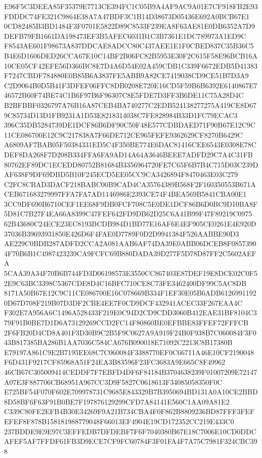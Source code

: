 \documentclass[UTF8,fontset=fandol,zihao=-4,a4paper]{ctexart}
\begin{document}
{{E96F5C3DEEA85F35379E7713CE394FC1C05B9A4AF9AC9A01E7CF918FB2E93FDDDC74FE321C9864E38A7A47BDF3C1B14D38673D05436E692A0BCB67E1
0CD82485B3BD1484F3F0701E5822D89C8533F239EA8F63AE81E0DB6352A7D9DEFB79FB1661DA198473EF3B5AFEC6031B1C3B7361E1DC789973A1ED9C
F8543AE601F98673A837DDCAE8ADCC80C437AEE1E1F0CBED837C35B36C5B4E6D1606DED26CCA67E10C14BF2B06FC82B5953E30F2C615F58E96BCB16A
10CE05CF42EFE56D366BC8E7D4A6D54E02A459CDB1C339F6672EDB5D41383F7247CBDF784880E0B85B6A3837FE5ABB9A82CE7419038CD9CE51B7D3A9
C2D9064B0D5B41F3DFEF06FFC8DB0208E720E16CD5F59B6B6392E6140867E746572B60F74BE74C1B6F97B6F96307C8E5FDE7D3FF3B6DE11C75A28D4C
B2BFBBF0326797A76B16A87CEB4BA740277C2EDB524138277275A419CE8D679C85734D13D1FB9231A1D53E8218314038C7FE828984B33D1FC79ECAC3
396C35DB5284739DE1DCF86B6DF90C50F48E577CDBDAED71F90B67E12C9C11CE086700E12C9C217838A7F66DE712CE965FEFE9362629CF8270B6429C
A6809AF7BAB05F50384331ED5C4F350BE774E6DAC81416CEE6543E0308E78CDEF8DA268F7D208B334FFA6FA9AD14A64A3646BEEE7ADFD29C7A4C31FB
80762EF89DC1ECEDD80752B81684B3356964720FE7C65F6B7B4C715D03C239DAF638F9DF69DBD5B10F245ECD5EE05CC9CA3426894F8470463E03C279
C2FC8CBAD3DACF218BABC00B9CAD4CA35764389B568F2F160350553B671ACEB671683279997FFA7FA7AD1146986E2393CE74F4BEA569B5841CBA00E1
3CC9DF690B6710CEF1EE68F9DB0FCF708C5E0DE1DCF86B6D0BC9D10BA8F5D81C7B27F4EA66A8399C47FEF642FD9DB62D25C6A41B99F47F89219C0975
62B43680C24ECE23EC8193BCDB984D1BD77E16AF6E4EF905CE0261E4E920D37036B39693931850E426D6F4FAE0D7789F0D2D9941384F526AABBE90D3
AE229C0BDB287ADFD2CCA2A081AAB6AF74DA39E0ABB06DCEB8F08573904F70B6B1C4987423239CA9FCFC69B880DADA39D277F5D78D87FF2C5602AEFA
5CAA39A34F70B6B744FD3D06198573E3550CC867403E87DEF19E8DCE02C0F52E9C63BC3398C5367CDE8D4C16BFC710CE8C73FE3462400DF99C5AC8DB
8171A50B67E12C9C11CE086700E16C078669B334F1EF30E05B6ADB61269911920D67D708F219B07D3DF2CBE4EE7F0CD9DCF432941ACEC33F267EAA4C
F302E7A956A6C1496A528433F219E0C94D2CD9CDD3060B412EAE31BF8104C379F91B0BE7D1D6A73129269CCD2FC14F80860BE0EFBBE83FFEF72FFFCB
2F6FB20D4CD8A401F3D30B9C2B5F9C0627A9A919F24B0F938B7C060084F3F043B817385BA286B1AA7036C584CA676B090018E71092C2213C8B17380B
E79197A861C9E2B7195EE68C7C060084F3388770EF0C66711A46E10CF2190048F6D431F9217CF85968A51F24EA3B83596F23FC3683A9E665C8F49962
46CB67C305009414CEDDF7F7EBFD4DF6F84184B3704638239F01007209E72147A07E3F887706CB68951A967CC3D9F5827C0618613F34085058350F0C
E725BF54F070F602E709978731C9685E843329B7B3950694BD131A0A10CE2BBD8D58BF6F63F91B0BE7F197876129299CFD7A84141E560C1AA09A81E2
C339C80FE2EFB4B30E34269F9A21B734CBA4F0F862B8809236BD87FFF3FEFEFEF8F878B158181988779048F66013EF4904E19CD172352CC219E433C0
237BDDE9E9E97C3EFFEDB7DFDEBF7F6F7040380B67E18C7006E10CD0DDCAFEF5AF7FFDF61FB3D9ECE7CF9FC60784F3F01FA4F7A75C7981F324CBC398
}}
\end{document}
